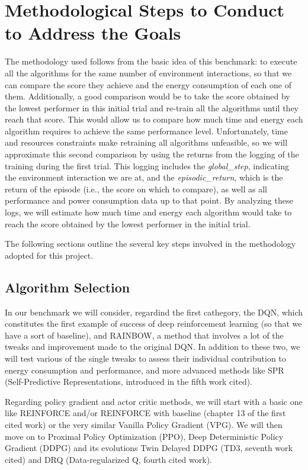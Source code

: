 \section{Methodological Steps to Conduct to Address the Goals}
\label{sec:methodologies}

The methodology used follows from the basic idea of this benchmark: to execute all the algorithms for the same number of environment interactions, so that we can compare the score they achieve and the energy consumption of each one of them. Additionally, a good comparison would be to take the score obtained by the lowest performer in this initial trial and re-train all the algorithms until they reach that score. This would allow us to compare how much time and energy each algorithm requires to achieve the same performance level. Unfortunately, time and resources constraints make retraining all algorithms unfeasible, so we will approximate this second comparison by using the returns from the logging of the training during the first trial. This logging includes the \textit{global\_step}, indicating the environment interaction we are at, and the \textit{episodic\_return}, which is the return of the episode (i.e., the score on which to compare), as well as all performance and power consumption data up to that point. By analyzing these logs, we will estimate how much time and energy each algorithm would take to reach the score obtained by the lowest performer in the initial trial. 

The following sections outline the several key steps involved in the methodology adopted for this project.

\subsection{Algorithm Selection}
\label{subsec:algorithm_selection}

In our benchmark we will consider, regardind the first cathegory, the DQN, which constitutes the first example of success of deep reinforcement learning (so that we have a sort of baseline), and RAINBOW, a method that involves a lot of the tweaks and improvement made to the original DQN. In addition to these two, we will test various of the single tweaks to assess their individual contribution to energy consumption and performance, and more advanced methods like SPR (Self-Predictive Representations, introduced in the fifth work cited).

Regarding policy gradient and actor critic methods, we will start with a basic one like REINFORCE and/or REINFORCE with baseline (chapter 13 of the first cited work) or the very similar Vanilla Policy Gradient (VPG). We will then move on to Proximal Policy Optimization (PPO), Deep Deterministic Policy Gradient (DDPG)  and its evolutions Twin Delayed DDPG (TD3, seventh work cited) and DRQ (Data-regularized Q, fourth cited work).

